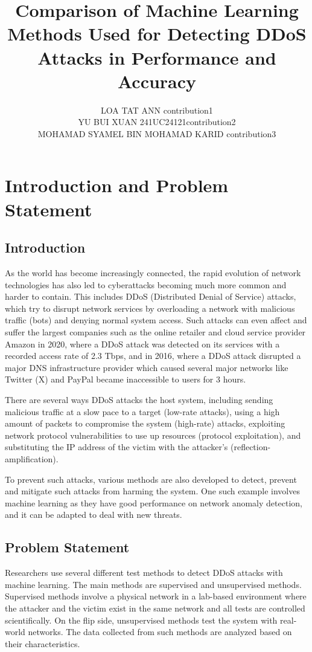 \documentclass[a4paper, 12pt]{article}
\author{
LOA TAT ANN \quad 1221304731 \quad  contribution1 \\
YU BUI XUAN \quad 241UC24121\quad contribution2\\
MOHAMAD SYAMEL BIN MOHAMAD KARID \quad 1221309130 \quad contribution3\\
}
\title{Comparison of Machine Learning Methods Used for Detecting DDoS Attacks in Performance and Accuracy}
\begin{document}
\maketitle


\begin{abstract}

\end{abstract}

\section{Introduction and Problem Statement}

\subsection{Introduction}
As the world has become increasingly connected, the rapid evolution of network technologies has also led to cyberattacks becoming much more common and harder to contain. This includes DDoS (Distributed Denial of Service) attacks, which try to disrupt network services by overloading a network with malicious traffic (bots) and denying normal system access.  Such attacks can even affect and suffer the largest companies such as the online retailer and cloud service provider Amazon in 2020, where a DDoS attack was detected on its services with a recorded access rate of 2.3 Tbps, and in 2016, where a DDoS attack disrupted a major DNS infrastructure provider which caused several major networks like Twitter (X) and PayPal became inaccessible to users for 3 hours.  

There are several ways DDoS attacks the host system, including sending malicious traffic at a slow pace to a target (low-rate attacks), using a high amount of packets to compromise the system (high-rate) attacks, exploiting network protocol vulnerabilities to use up resources (protocol exploitation), and substituting the IP address of the victim with the attacker's (reflection-amplification).  

To prevent such attacks, various methods are also developed to detect, prevent and mitigate such attacks from harming the system. One such example involves machine learning as they have good performance on network anomaly detection, and it can be adapted to deal with new threats. 

\subsection{Problem Statement}
Researchers use several different test methods to detect DDoS attacks with machine learning. The main methods are supervised and unsupervised methods. Supervised methods involve a physical network in a lab-based environment where the attacker and the victim exist in the same network and all tests are controlled scientifically. On the flip side, unsupervised methods test the system with real-world networks. The data collected from such methods are analyzed based on their characteristics. 
\end{document}
